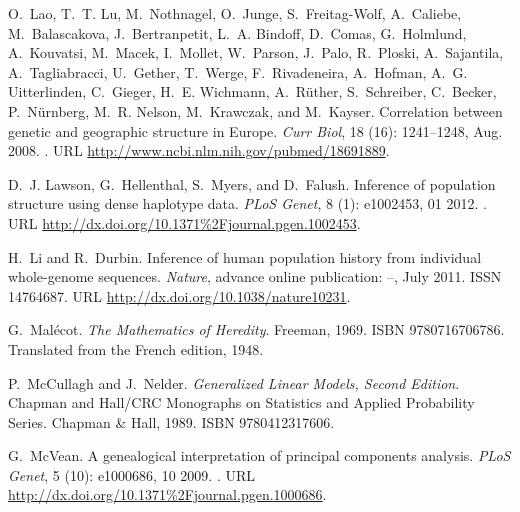 \documentclass{article}
\begin{document}
\begin{thebibliography}{76}
O.~Lao, T.~T. Lu, M.~Nothnagel, O.~Junge, S.~Freitag-Wolf, A.~Caliebe,
  M.~Balascakova, J.~Bertranpetit, L.~A. Bindoff, D.~Comas, G.~Holmlund,
  A.~Kouvatsi, M.~Macek, I.~Mollet, W.~Parson, J.~Palo, R.~Ploski,
  A.~Sajantila, A.~Tagliabracci, U.~Gether, T.~Werge, F.~Rivadeneira,
  A.~Hofman, A.~G. Uitterlinden, C.~Gieger, H.~E. Wichmann, A.~R{\"u}ther,
  S.~Schreiber, C.~Becker, P.~N{\"u}rnberg, M.~R. Nelson, M.~Krawczak, and
  M.~Kayser.
\newblock Correlation between genetic and geographic structure in {Europe}.
\newblock \emph{Curr Biol}, 18 (16): 1241--1248, Aug. 2008.
\newblock {}.
\newblock URL \url{http://www.ncbi.nlm.nih.gov/pubmed/18691889}.

D.~J. Lawson, G.~Hellenthal, S.~Myers, and D.~Falush.
\newblock Inference of population structure using dense haplotype data.
\newblock \emph{PLoS Genet}, 8 (1): e1002453, 01 2012.
\newblock {}.
\newblock URL \url{http://dx.doi.org/10.1371%2Fjournal.pgen.1002453}.

H.~Li and R.~Durbin.
\newblock Inference of human population history from individual whole-genome
  sequences.
\newblock \emph{Nature}, advance online publication: --, July 2011.
\newblock ISSN 14764687.
\newblock URL \url{http://dx.doi.org/10.1038/nature10231}.

G.~Mal{\'e}cot.
\newblock \emph{The Mathematics of Heredity}.
\newblock Freeman, 1969.
\newblock ISBN 9780716706786.
\newblock Translated from the French edition, 1948.

P.~McCullagh and J.~Nelder.
\newblock \emph{Generalized Linear Models, Second Edition}.
\newblock Chapman and Hall/CRC Monographs on Statistics and Applied Probability
  Series. Chapman \& Hall, 1989.
\newblock ISBN 9780412317606.

G.~McVean.
\newblock A genealogical interpretation of principal components analysis.
\newblock \emph{PLoS Genet}, 5 (10): e1000686, 10 2009.
\newblock {}.
\newblock URL \url{http://dx.doi.org/10.1371%2Fjournal.pgen.1000686}.


\end{thebibliography}
\end{document}
